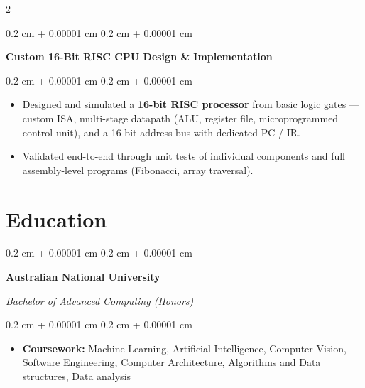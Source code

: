 \documentclass[10pt, letterpaper]{article}
\newenvironment{highlights}{
    \begin{itemize}[
        topsep=0.03 cm,
        parsep=0.03 cm,
        partopsep=0pt,
        itemsep=0pt,
        leftmargin=0.4 cm + 10pt
    ]
}{
    \end{itemize}
} %
\newenvironment{onecolentry}{
    \begin{adjustwidth}{
        0.2 cm + 0.00001 cm
    }{
        0.2 cm + 0.00001 cm
    }
}{
    \end{adjustwidth}
} %
\newenvironment{twocolentry}[2][]{
    \onecolentry
    \def\secondColumn{#2}
}{
    \hfill \secondColumn
    \endonecolentry
} %
\let\hrefWithoutArrow\href
\renewcommand{\href}[2]{\hrefWithoutArrow{#1}{\ifthenelse{\equal{#2}{}}{ }{#2 }\raisebox{.15ex}{\footnotesize \faExternalLink*}}}
\begin{document}
\begin{paracol}{2}
    \begin{twocolentry}{
        \href{https://github.com/razeenwasif/Comp-Architecture/tree/main/16-bit-cpu}{github}
    }
        \textbf{Custom 16-Bit RISC CPU Design \& Implementation}
    \end{twocolentry}

    \vspace{0.05 cm}
    \begin{onecolentry}
        \begin{highlights}
            \item Designed and simulated a \textbf{16-bit RISC processor} from basic logic gates — custom ISA, multi-stage datapath (ALU, register file, microprogrammed control unit), and a 16-bit address bus with dedicated PC / IR.
            \item Validated end-to-end through unit tests of individual components and full assembly-level programs (Fibonacci, array traversal).
        \end{highlights}
    \end{onecolentry}

    \switchcolumn


    \section{Education}

        
        \begin{onecolentry}
            \textbf{Australian National University}

            \textit{Bachelor of Advanced Computing (Honors)}
        \end{onecolentry}

        \vspace{0.05 cm}
        \begin{onecolentry}
            \begin{highlights}
                \item \textbf{Coursework:} Machine Learning, Artificial Intelligence, Computer Vision, Software Engineering, Computer Architecture, Algorithms and Data structures, Data analysis
            \end{highlights}
        \end{onecolentry}

        \vspace{0.05 cm}




\end{paracol}
\end{document}

